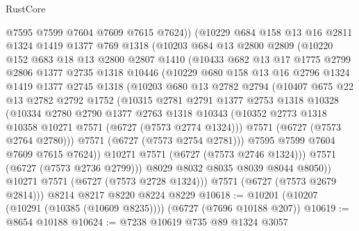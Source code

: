 \begin{lexlean}{RustCore}
\begin{coremodule}
          @7595
          @7599
          @7604
          @7609
          @7615
          @7624))
      (@10229
        @684
        @158
        @13
        @16
        @2811
        @1324
        @1419
        @1377
        @769
        @1318
        (@10203
          @684
          @13
          @2800
          @2809
          (@10220
            @152
            @683
            @18
            @13
            @2800
            @2807
            @1410
            (@10433
              @682
              @13
              @17
              @1775
              @2799
              @2806
              @1377
              @2735
              @1318
              @10446
              (@10229
                @680
                @158
                @13
                @16
                @2796
                @1324
                @1419
                @1377
                @2745
                @1318
                (@10203
                  @680
                  @13
                  @2782
                  @2794
                  (@10407
                    @675
                    @22
                    @13
                    @2782
                    @2792
                    @1752
                    (@10315
                      @2781
                      @2791
                      @1377
                      @2753
                      @1318
                      @10328
                      (@10334
                        @2780
                        @2790
                        @1377
                        @2763
                        @1318
                        @10343
                        (@10352 @2773 @1318 @10358 @10271 @7571 (@6727 (@7573 @2774 @1324)))
                        @7571
                        (@6727 (@7573 @2764 @2780)))
                      @7571
                      (@6727 (@7573 @2754 @2781)))
                    @7595
                    @7599
                    @7604
                    @7609
                    @7615
                    @7624))
                @10271
                @7571
                (@6727 (@7573 @2746 @1324)))
              @7571
              (@6727 (@7573 @2736 @2799)))
            @8029
            @8032
            @8035
            @8039
            @8044
            @8050))
        @10271
        @7571
        (@6727 (@7573 @2728 @1324)))
      @7571
      (@6727 (@7573 @2679 @2814)))
    @8214
    @8217
    @8220
    @8224
    @8229
@10618 := @10201 (@10207 (@10291 (@10385 (@10609 @8235)))) (@6727 (@7696 @10188 @207))
@10619 := @8654 @10188
@10624 := @7238 @10619 @735 @89 @1324 @3057

\end{coremodule}
\end{lexlean}
